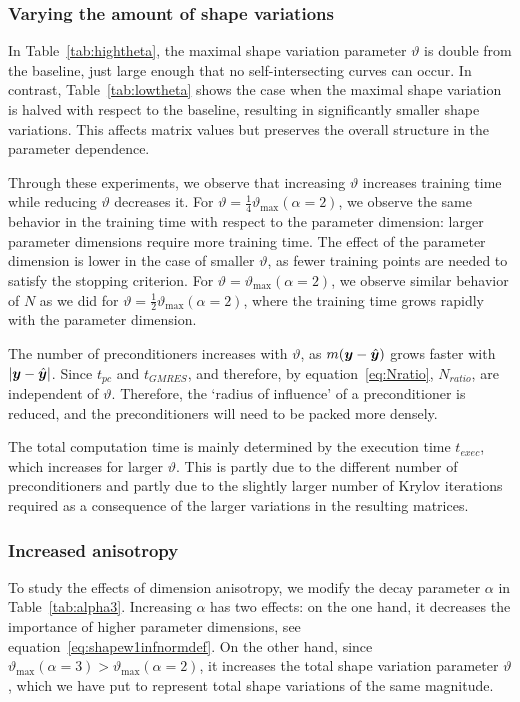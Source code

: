 \subsubsection{Varying the amount of shape variations}
In Table~\ref{tab:hightheta}, the maximal shape variation parameter $\vartheta$ is double from the baseline, just large enough that no self-intersecting curves can occur.
In contrast, Table~\ref{tab:lowtheta} shows the case when the maximal shape variation is halved with respect to the baseline, resulting in significantly smaller shape variations.
This affects matrix values but preserves the overall structure in the parameter dependence.

Through these experiments, we observe that increasing $\vartheta$ increases training time while reducing $\vartheta$ decreases it.
For $\vartheta = \frac{1}{4}\vartheta_{\max}(\alpha=2)$, we observe the same behavior in the training time with respect to the parameter dimension: larger parameter dimensions require more training time.
The effect of the parameter dimension is lower in the case of smaller $\vartheta$, as fewer training points are needed to satisfy the stopping criterion.
For $\vartheta = \vartheta_{\max}(\alpha=2)$, we observe similar behavior of $N$ as we did for $\vartheta=\frac{1}{2}\vartheta_{\max}(\alpha=2)$, where the training time grows rapidly with the parameter dimension.

The number of preconditioners increases with $\vartheta$, as $m({\bm{y}}-\hat{\bm{y}})$ grows faster with $|{\bm{y}}-\hat{\bm{y}}|$.
Since $t_{pc}$ and $t_{GMRES}$, and therefore, by equation~\eqref{eq:Nratio}, $N_{ratio}$, are independent of $\vartheta$.
Therefore, the `radius of influence' of a preconditioner is reduced, and the preconditioners will need to be packed more densely.

The total computation time is mainly determined by the execution time $t_{exec}$, which increases for larger $\vartheta$.
This is partly due to the different number of preconditioners and partly due to the slightly larger number of Krylov iterations required as a consequence of the larger variations in the resulting matrices.

\subsubsection{Increased anisotropy}
To study the effects of dimension anisotropy, we modify the decay parameter $\alpha$ in Table~\ref{tab:alpha3}.
Increasing $\alpha$ has two effects: on the one hand, it decreases the importance of higher parameter dimensions, see equation~\eqref{eq:shapew1infnormdef}.
On the other hand, since $\vartheta_{\max}(\alpha=3) > \vartheta_{\max}(\alpha=2)$, it increases the total shape variation parameter $\vartheta$, which we have put to represent total shape variations of the same magnitude.

